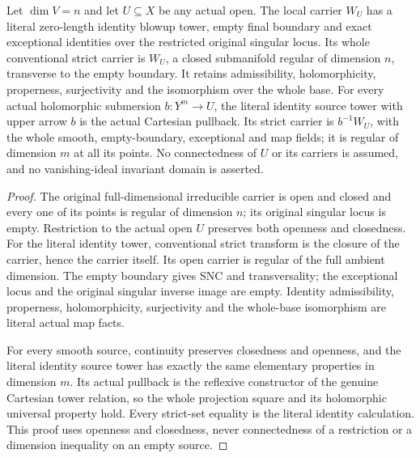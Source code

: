 \begin{theorem}
\label{hir:original-local-full-dimension-identity-family}
\leanok
Let $\dim V=n$ and let $U\subseteq X$ be any actual open. The local
carrier $W_U$ has a literal zero-length identity blowup tower, empty final
boundary and exact exceptional identities over the restricted original
singular locus. Its whole conventional strict carrier is $W_U$, a closed
submanifold regular of dimension $n$, transverse to the empty boundary.
It retains admissibility, holomorphicity, properness, surjectivity and the
isomorphism over the whole base. For every actual holomorphic submersion
$b:Y^m\to U$, the literal identity source tower with upper arrow $b$ is the
actual Cartesian pullback. Its strict carrier is $b^{-1}W_U$, with the
whole smooth, empty-boundary, exceptional and map fields; it is regular
of dimension $m$ at all its points. No connectedness of $U$ or its carriers
is assumed, and no vanishing-ideal invariant domain is asserted.
\end{theorem}
\begin{proof}
The original full-dimensional irreducible carrier is open and closed and
every one of its points is regular of dimension $n$; its original singular
locus is empty. Restriction to the actual open $U$ preserves both openness
and closedness. For the literal identity tower, conventional strict
transform is the closure of the carrier, hence the carrier itself.
Its open carrier is regular of the full ambient dimension. The empty
boundary gives SNC and transversality; the exceptional locus and the
original singular inverse image are empty. Identity admissibility,
properness, holomorphicity, surjectivity and the whole-base isomorphism
are literal actual map facts.

For every smooth source, continuity preserves closedness and openness,
and the literal identity source tower has exactly the same elementary
properties in dimension $m$. Its actual pullback is the reflexive
constructor of the genuine Cartesian tower relation, so the whole
projection square and its holomorphic universal property hold. Every
strict-set equality is the literal identity calculation. This proof
uses openness and closedness, never connectedness of a restriction or
a dimension inequality on an empty source.
\end{proof}


